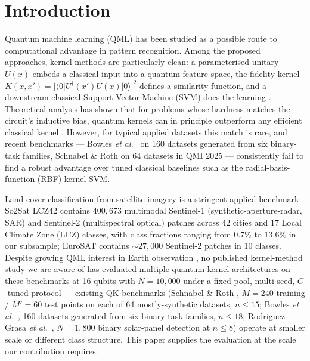 \documentclass[pdflatex,sn-mathphys]{sn-jnl}
\theoremstyle{plain}
\theoremstyle{remark}
\theoremstyle{definition}
\begin{document}

\maketitle

\section{Introduction}\label{sec:intro}

Quantum machine learning (QML) has been studied as a possible route to computational advantage in pattern recognition. Among the proposed approaches, kernel methods are particularly clean: a parameterised unitary $U(x)$ embeds a classical input into a quantum feature space, the fidelity kernel $K(x,x')=|\langle 0|U^\dagger(x')U(x)|0\rangle|^2$ defines a similarity function, and a downstream classical Support Vector Machine (SVM) does the learning \cite{havlicek2019,schuld2019}. Theoretical analysis has shown that for problems whose hardness matches the circuit's inductive bias, quantum kernels can in principle outperform any efficient classical kernel \cite{liu2021}. However, for typical applied datasets this match is rare, and recent benchmarks --- Bowles \emph{et al.}\ \cite{bowles2024} on 160 datasets generated from six binary-task families, Schnabel \& Roth \cite{schnabel2025} on 64 datasets in QMI 2025 --- consistently fail to find a robust advantage over tuned classical baselines such as the radial-basis-function (RBF) kernel SVM.

Land cover classification from satellite imagery is a stringent applied benchmark: So2Sat LCZ42 \cite{zhu2020} contains $400{,}673$ multimodal Sentinel-1 (synthetic-aperture-radar, SAR) and Sentinel-2 (multispectral optical) patches across 42 cities and 17 Local Climate Zone (LCZ) classes, with class fractions ranging from $0.7\%$ to $13.6\%$ in our subsample; EuroSAT \cite{helber2019} contains $\sim\!27{,}000$ Sentinel-2 patches in 10 classes. Despite growing QML interest in Earth observation \cite{rodriguez2025}, no published kernel-method study we are aware of has evaluated multiple quantum kernel architectures on these benchmarks at 16 qubits with $N=10{,}000$ under a fixed-pool, multi-seed, $C$-tuned protocol --- existing QK benchmarks (Schnabel \& Roth \cite{schnabel2025}, $M\!=\!240$ training / $M'\!=\!60$ test points on each of 64 mostly-synthetic datasets, $n\!\le\!15$; Bowles \emph{et al.}\ \cite{bowles2024}, 160 datasets generated from six binary-task families, $n\!\le\!18$; Rodriguez-Grasa \emph{et al.}\ \cite{rodriguez2025}, $N\!=\!1{,}800$ binary solar-panel detection at $n\!\le\!8$) operate at smaller scale or different class structure. This paper supplies the evaluation at the scale our contribution requires.
\end{document}
